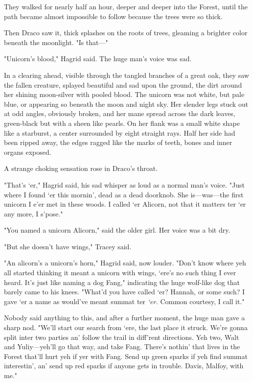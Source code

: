 They walked for nearly half an hour, deeper and deeper into the Forest, until
the path became almost impossible to follow because the trees were so thick.

Then Draco saw it, thick splashes on the roots of trees, gleaming a brighter
color beneath the moonlight. "Is that\mbox{---}"

"Unicorn's blood," Hagrid said. The huge man's voice was sad.

In a clearing ahead, visible through the tangled branches of a great oak, they
saw the fallen creature, splayed beautiful and sad upon the ground, the dirt
around her shining moon-silver with pooled blood. The unicorn was not white,
but pale blue, or appearing so beneath the moon and night sky. Her slender legs
stuck out at odd angles, obviously broken, and her mane spread across the dark
leaves, green-black but with a sheen like pearls. On her flank was a small
white shape like a starburst, a center surrounded by eight straight rays. Half
her side had been ripped away, the edges ragged like the marks of teeth, bones
and inner organs exposed.

A strange choking sensation rose in Draco's throat.

"That's `er," Hagrid said, his sad whisper as loud as a normal man's voice.
"Just where I found `er this mornin', dead as a dead doorknob. She
is---was---the first unicorn I e'er met in these woods. I called `er Alicorn,
not that it matters ter `er any more, I s'pose."

"You named a unicorn Alicorn," said the older girl. Her voice was a bit dry.

"But she doesn't have wings," Tracey said.

"An alicorn's a unicorn's horn," Hagrid said, now louder. "Don't know where yeh
all started thinking it meant a unicorn with wings, `ere's no such thing I ever
heard. It's just like naming a dog Fang," indicating the huge wolf-like dog
that barely came to his knees. "What'd you have called `er? Hannah, or some
such? I gave `er a name as would've meant summat ter \emph{`er.} Common
courtesy, I call it."

Nobody said anything to this, and after a further moment, the huge man gave a
sharp nod. "We'll start our search from `ere, the last place it struck. We're
gonna split inter two parties an' follow the trail in diff'rent directions. Yeh
two, Walt and Yuliy---yeh'll go that way, and take Fang. There's nothin' that
lives in the Forest that'll hurt yeh if yer with Fang. Send up green sparks if
yeh find summat interestin', an' send up red sparks if anyone gets in trouble.
Davis, Malfoy, with me."


